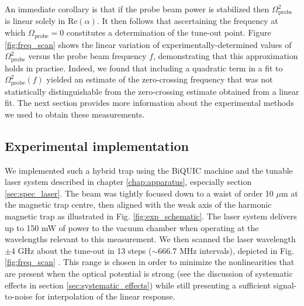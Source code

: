 	An immediate corollary is that if the probe beam power is stabilized then $\Omega_\mathrm{probe}^2$	is linear solely in $\mathrm{Re}(\alpha)$. 
	It then follows that ascertaining the frequency at which $\Omega_\mathrm{probe}=0$ constitutes a determination of the tune-out point.
	Figure \ref{fig:freq_scan} shows the linear variation of experimentally-determined values of $\Omega_\mathrm{probe}^2$ versus the probe beam frequency $f$, demonstrating that this approximation holds in practise. 
	Indeed, we found that including a quadratic term in a fit to $\Omega_\mathrm{probe}^2(f)$ yielded an estimate of the zero-crossing frequency that was not statistically distinguishable from the zero-crossing estimate obtained from a linear fit.
	The next section provides more information about the experimental methods we used to obtain these measurements.







\subsection{Experimental implementation}
	\label{sec:implementation}
	We implemented such a hybrid trap using the BiQUIC machine and the tunable laser system described in chapter \ref{chap:apparatus}, especially section \ref{sec:spec_laser}. 
	The beam was tightly focused down to a waist of order 10 $\mu$m at the magnetic trap centre, then aligned with the weak axis of the harmonic magnetic trap as illustrated in Fig. \ref{fig:exp_schematic}.
	The laser system delivers up to 150 mW of power to the vacuum chamber when operating at the wavelengths relevant to this measurement. 
	We then scanned the laser wavelength $\pm4$ GHz about the tune-out in 13 steps ($\sim666.7$ MHz intervals), depicted in Fig. \ref{fig:freq_scan} .	
	This range is chosen in order to minimize the nonlinearities that are present when the optical potential is strong (see the discussion of systematic effects in section \ref{sec:systematic_effects}) while still presenting a sufficient signal-to-noise for interpolation of the linear response.
	
